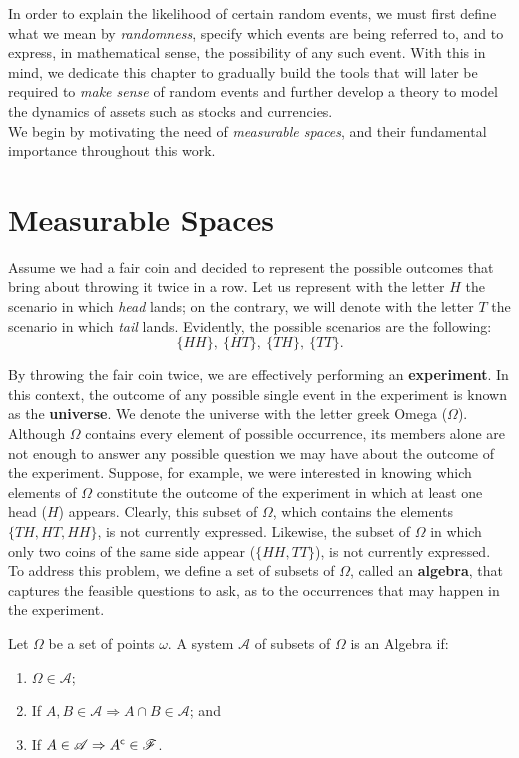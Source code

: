 \documentclass[../TGMAFFIRO.tex]{subfiles}
\begin{document}
In order to explain the likelihood of certain random events, we must first define what we mean by \textit{randomness}, specify which events are being referred to, and to express, in mathematical sense, the possibility of any such event. With this in mind, we dedicate this chapter to gradually build the tools that will later be required to \textit{make sense} of random events and further develop a theory to model the dynamics of assets such as stocks and currencies.\\

We begin by motivating the need of \textit{measurable spaces}, and their fundamental importance throughout this work.

\section{Measurable Spaces}
Assume we had a fair coin and decided to represent the possible outcomes that bring about throwing it twice in a row. Let us represent with the letter $H$ the scenario in which \textit{head} lands; on the contrary, we will denote with the letter $T$ the scenario in which \textit{tail} lands. Evidently, the possible scenarios are the following: 
\[
	\{HH\}, \ \{HT\}, \ \{TH\}, \ \{TT\}.
\]

By throwing the fair coin twice, we are effectively performing an \textbf{experiment}. In this context, the outcome of any possible single event in the experiment is known as the \textbf{universe}. We denote the universe with the letter greek Omega ($\Omega$).\\

Although $\Omega$ contains every element of possible occurrence, its members alone are not enough to answer any possible question we may have about the outcome of the experiment. Suppose, for example, we were interested in knowing which elements of $\Omega$ constitute the outcome of the experiment in which at least one head ($H$) appears.  Clearly, this subset of $\Omega$, which contains the elements $\{TH, HT, HH\}$, is not currently expressed. Likewise, the subset of $\Omega$ in which only two coins of the same side appear ($\{HH, TT\}$), is not currently expressed.\\

To address this problem, we define a set of subsets of $\Omega$, called an \textbf{algebra}, that captures the feasible questions to ask, as to the occurrences that may happen in the experiment.

\begin{definition}\label{def:algebra}
	Let $\Omega$ be a set of points $\omega$. A system $\mathscr{A}$ of subsets of $\Omega$ is an Algebra if:
	\begin{enumerate}
		\item $\Omega \in \mathscr{A}$;
		\item If $A, B \in \mathscr{A} \Rightarrow A \cap B \in \mathscr{A}$; and
		\item If $A \in \mathscr{A} \Rightarrow A^\mathsf{c} \in \mathscr{F}$.
	\end{enumerate}
\end{definition}
\end{document}
